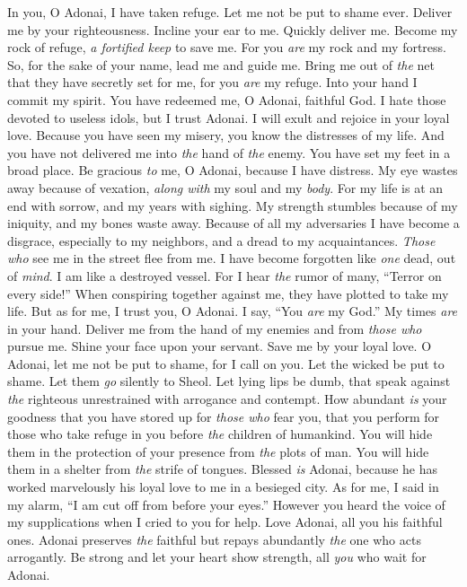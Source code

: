\begin{biblechapter} %
 In you, O Adonai, I have taken refuge. 
Let me not be put to shame ever. 
Deliver me by your righteousness.
\verse Incline your ear to me. 
Quickly deliver me. 
Become my rock of refuge, 
\textit{a fortified keep} to save me.
\verse For you \textit{are} my rock and my fortress. 
So, for the sake of your name, 
lead me and guide me.
\verse Bring me out of \textit{the} net that they have secretly set for me, 
for you \textit{are} my refuge.
\verse Into your hand I commit my spirit. 
You have redeemed me, O Adonai, faithful God.
\verse I hate those devoted to useless idols, 
but I trust Adonai.
\verse I will exult and rejoice in your loyal love. 
Because you have seen my misery, 
you know the distresses of my life.
\verse And you have not delivered me 
into \textit{the} hand of \textit{the} enemy. 
You have set my feet in a broad place.
\verse Be gracious \textit{to} me, O Adonai, 
because I have distress. 
My eye wastes away because of vexation, 
\textit{along with} my soul and my \textit{body}.
\verse For my life is at an end with sorrow, 
and my years with sighing. 
My strength stumbles because of my iniquity, 
and my bones waste away.
\verse Because of all my adversaries I have become a disgrace, 
especially to my neighbors, 
and a dread to my acquaintances. 
\textit{Those who} see me in the street flee from me.
\verse I have become forgotten like \textit{one} dead, out of \textit{mind}. 
I am like a destroyed vessel.
\verse For I hear \textit{the} rumor of many, 
“Terror on every side!” 
When conspiring together against me, 
they have plotted to take my life.
\verse But as for me, I trust you, O Adonai. 
I say, “You \textit{are} my God.”
\verse My times \textit{are} in your hand. 
Deliver me from the hand of my enemies 
and from \textit{those who} pursue me.
\verse Shine your face upon your servant. 
Save me by your loyal love.
\verse O Adonai, let me not be put to shame, for I call on you. 
Let the wicked be put to shame. 
Let them \textit{go} silently to Sheol.
\verse Let lying lips be dumb, 
that speak against \textit{the} righteous unrestrained 
with arrogance and contempt.
\verse How abundant \textit{is} your goodness 
that you have stored up for \textit{those who} fear you, 
that you perform for those who take refuge in you 
before \textit{the} children of humankind.
\verse You will hide them in the protection of your presence 
from \textit{the} plots of man. 
You will hide them in a shelter from \textit{the} strife of tongues.
\verse Blessed \textit{is} Adonai, 
because he has worked marvelously his loyal love to me 
in a besieged city.
\verse As for me, I said in my alarm, 
“I am cut off from before your eyes.” 
However you heard the voice of my supplications 
when I cried to you for help.
\verse Love Adonai, all you his faithful ones. 
Adonai preserves \textit{the} faithful 
but repays abundantly \textit{the} one who acts arrogantly.
\verse Be strong and let your heart show strength, 
all \textit{you} who wait for Adonai.
\end{biblechapter}

